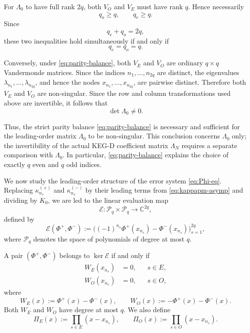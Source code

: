 \documentclass[11pt,a4paper]{article}
\theoremstyle{definition}
\begin{document}
For \(\Lambda_0\) to have full rank \(2q\), both \(V_O\) and \(V_E\)
must have rank \(q\). Hence necessarily
\[
q_o\geq q,
\qquad
q_e\geq q.
\]
Since
\[
q_e+q_o=2q,
\]
these two inequalities hold simultaneously if and only if
\begin{equation}\label{eq:parity-balance}
q_e=q_o=q.
\end{equation}

Conversely, under \eqref{eq:parity-balance}, both \(V_E\) and \(V_O\)
are ordinary \(q\times q\) Vandermonde matrices. Since the indices
\(n_1,\dots,n_{2q}\) are distinct, the eigenvalues
\(\lambda_{n_1},\dots,\lambda_{n_{2q}}\), and hence the nodes
\(x_{n_1},\dots,x_{n_{2q}}\), are pairwise distinct. Therefore both
\(V_E\) and \(V_O\) are non-singular. Since the row and column
transformations used above are invertible, it follows that
\[
\det\Lambda_0\neq0.
\]

Thus, the strict parity balance \eqref{eq:parity-balance} is necessary
and sufficient for the leading-order matrix \(\Lambda_0\) to be
non-singular. This conclusion concerns \(\Lambda_0\) only; the
invertibility of the actual KEG-D coefficient matrix \(\Lambda_N\)
requires a separate comparison with \(\Lambda_0\). In particular,
\eqref{eq:parity-balance} explains the choice of exactly \(q\) even
and \(q\) odd indices.

We now study the leading-order structure of the error system
\eqref{eq:Phi-eq}. Replacing
\(\kappa_{n_s}^{(+)}\) and \(\kappa_{n_s}^{(-)}\) by their leading
terms from \eqref{eq:kappapm-asymp} and dividing by \(K_0\), we are
led to the linear evaluation map
\[
\mathcal E:
\mathcal P_q\times\mathcal P_q
\longrightarrow
\mathbb C^{2q},
\]
defined by
\[
\mathcal E(\Phi^+,\Phi^-)
:=
\bigl(
(-1)^{n_s}\Phi^+(x_{n_s})
-
\Phi^-(x_{n_s})
\bigr)_{s=1}^{2q},
\]
where \(\mathcal P_q\) denotes the space of polynomials of degree at
most \(q\).

A pair \((\Phi^+,\Phi^-)\) belongs to \(\ker\mathcal E\) if and only
if
\begin{equation}\label{eq:WW'}
\begin{aligned}
W_E(x_{n_s})&=0, && s\in E,\\
W_O(x_{n_s})&=0, && s\in O,
\end{aligned}
\end{equation}
where
\begin{equation}\label{eq:WW'-def}
W_E(x):=\Phi^+(x)-\Phi^-(x),
\qquad
W_O(x):=-\Phi^+(x)-\Phi^-(x).
\end{equation}
Both \(W_E\) and \(W_O\) have degree at most \(q\). We also define
\begin{equation}\label{eq:Pi-EO}
\Pi_E(x):=\prod_{s\in E}(x-x_{n_s}),
\qquad
\Pi_O(x):=\prod_{s\in O}(x-x_{n_s}).
\end{equation}
\end{document}
